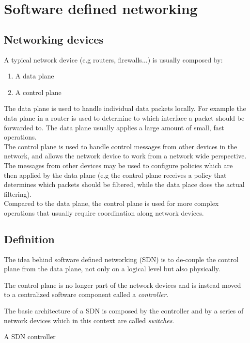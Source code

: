 \documentclass{article}
\begin{document}
	
	\section{Software defined networking}
	
	\subsection{Networking devices}
	A typical network device (e.g routers, firewalls...) is usually composed by:
	\begin{enumerate}
		\item A data plane 
		\item A control plane
	\end{enumerate}
	
	The data plane is used to handle individual data packets locally.
	For example the data plane in a router is used to determine to which interface a packet should be forwarded to.
	The data plane usually applies a large amount of small, fast operations. \\
	The control plane is used to handle control messages from other devices in the network, and allows the network device to work from a network wide perspective. \\
	The messages from other devices may be  used to configure policies which are then applied by the data plane (e.g the control plane receives a policy that determines which packets should be filtered, while the data place does the actual filtering). \\
	Compared to the data plane, the control plane is used for more complex operations that usually require coordination along network devices.
	

	
	\subsection{Definition}
	The idea behind software defined networking (SDN) is to de-couple the control plane from the data plane, not only on a logical level but also physically.
	
	The control plane is no longer part of the network devices and is instead moved to a  centralized software component called a \textit{controller}.
	
	The basic architecture of a SDN is composed by the controller and by a series of network devices which in this context are called \textit{switches}.
	
	
	A SDN controller
	
\end{document}
